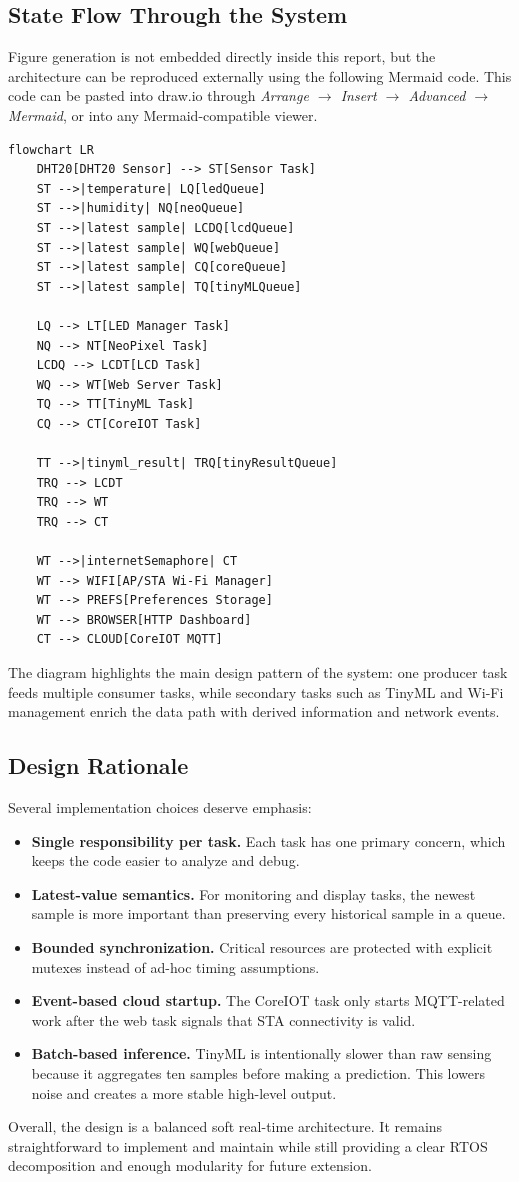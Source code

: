 \subsection{State Flow Through the System}
Figure generation is not embedded directly inside this report, but the
architecture can be reproduced externally using the following Mermaid code.
This code can be pasted into draw.io through
\textit{Arrange $\rightarrow$ Insert $\rightarrow$ Advanced $\rightarrow$
Mermaid}, or into any Mermaid-compatible viewer.

\begin{verbatim}
flowchart LR
    DHT20[DHT20 Sensor] --> ST[Sensor Task]
    ST -->|temperature| LQ[ledQueue]
    ST -->|humidity| NQ[neoQueue]
    ST -->|latest sample| LCDQ[lcdQueue]
    ST -->|latest sample| WQ[webQueue]
    ST -->|latest sample| CQ[coreQueue]
    ST -->|latest sample| TQ[tinyMLQueue]

    LQ --> LT[LED Manager Task]
    NQ --> NT[NeoPixel Task]
    LCDQ --> LCDT[LCD Task]
    WQ --> WT[Web Server Task]
    TQ --> TT[TinyML Task]
    CQ --> CT[CoreIOT Task]

    TT -->|tinyml_result| TRQ[tinyResultQueue]
    TRQ --> LCDT
    TRQ --> WT
    TRQ --> CT

    WT -->|internetSemaphore| CT
    WT --> WIFI[AP/STA Wi-Fi Manager]
    WT --> PREFS[Preferences Storage]
    WT --> BROWSER[HTTP Dashboard]
    CT --> CLOUD[CoreIOT MQTT]
\end{verbatim}

The diagram highlights the main design pattern of the system: one producer task
feeds multiple consumer tasks, while secondary tasks such as TinyML and Wi-Fi
management enrich the data path with derived information and network events.

\subsection{Design Rationale}
Several implementation choices deserve emphasis:
\begin{itemize}
  \item \textbf{Single responsibility per task.} Each task has one primary
  concern, which keeps the code easier to analyze and debug.
  \item \textbf{Latest-value semantics.} For monitoring and display tasks, the
  newest sample is more important than preserving every historical sample in a
  queue.
  \item \textbf{Bounded synchronization.} Critical resources are protected with
  explicit mutexes instead of ad-hoc timing assumptions.
  \item \textbf{Event-based cloud startup.} The CoreIOT task only starts
  MQTT-related work after the web task signals that STA connectivity is valid.
  \item \textbf{Batch-based inference.} TinyML is intentionally slower than raw
  sensing because it aggregates ten samples before making a prediction. This
  lowers noise and creates a more stable high-level output.
\end{itemize}

Overall, the design is a balanced soft real-time architecture. It remains
straightforward to implement and maintain while still providing a clear RTOS
decomposition and enough modularity for future extension.
